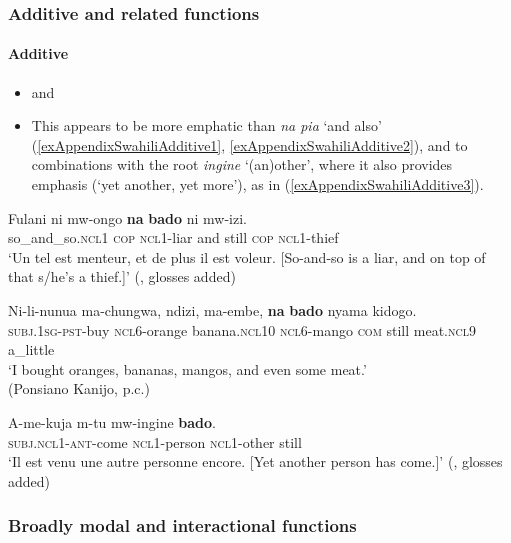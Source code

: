 \subsubsection{Additive and related functions}
\paragraph{Additive}\label{appendixSwahiliAdditive}
\begin{itemize}
	\item \textcite[85]{Sacleux19391941} and \textcite{Schadeberg1990}
	\item This appears to be more emphatic than \textit{na pia} \lq and also' (\ref{exAppendixSwahiliAdditive1}, \ref{exAppendixSwahiliAdditive2}), and to combinations with the root \textit{ingine} \lq (an)other', where it also provides emphasis  (\lq yet another, yet more'), as in (\ref{exAppendixSwahiliAdditive3}).
\end{itemize}
\begin{exe}
	\ex\label{exAppendixSwahiliAdditive1}
	\gll Fulani ni mw-ongo \textbf{na} \textbf{bado} ni mw-izi.\\
	so\_and\_so.\textsc{ncl}1 \textsc{cop} \textsc{ncl}1-liar and still \textsc{cop} \textsc{ncl}1-thief\\
	\glt \lq Un tel est menteur, et de plus il est voleur. [So-and-so is a liar, and on top of that s/he's a thief.]’ (\cite[85]{Sacleux19391941}, glosses added)
	
	\ex\label{exAppendixSwahiliAdditive2}
	\gll Ni-li-nunua ma-chungwa, ndizi, ma-embe, \textbf{na} \textbf{bado} nyama kidogo.\\
	\textsc{subj}.1\textsc{sg}-\textsc{pst}-buy \textsc{ncl}6-orange banana.\textsc{ncl}10 \textsc{ncl}6-mango \textsc{com} still meat.\textsc{ncl}9 a\_little\\
	\glt \lq I bought oranges, bananas, mangos, and even some meat.'
	\\(Ponsiano Kanijo, p.c.)

	\ex\label{exAppendixSwahiliAdditive3}
	\gll A-me-kuja m-tu mw-ingine \textbf{bado}.\\
	\textsc{subj}.\textsc{ncl}1-\textsc{ant}-come \textsc{ncl}1-person \textsc{ncl}1-other still\\
	\glt \lq Il est venu une autre personne encore. [Yet another person has come.]' (\cite[85]{Sacleux19391941}, glosses added)
\end{exe}



\subsubsection{Broadly modal and interactional functions}
